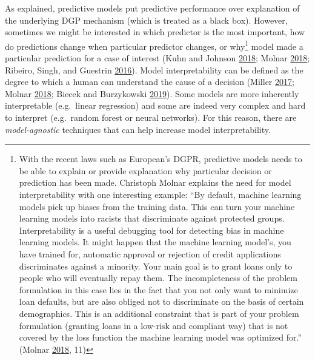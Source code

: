 \documentclass[
]{book}
\begin{document}
As explained, predictive models put predictive performance over explanation of the underlying DGP mechanism (which is treated as a black box). However, sometimes we might be interested in which predictor is the most important, how do predictions change when particular predictor changes, or why\footnote{With the recent laws such as European's DGPR, predictive models needs to be able to explain or provide explanation why particular decision or prediction has been made. Christoph Molnar explains the need for model interpretability with one interesting example: ``By default, machine learning models pick up biases from the training data. This can turn your machine learning models into racists that discriminate against protected groups. Interpretability is a useful debugging tool for detecting bias in machine learning models. It might happen that the machine learning model's, you have trained for, automatic approval or rejection of credit applications discriminates against a minority. Your main goal is to grant loans only to people who will eventually repay them. The incompleteness of the problem formulation in this case lies in the fact that you not only want to minimize loan defaults, but are also obliged not to discriminate on the basis of certain demographics. This is an additional constraint that is part of your problem formulation (granting loans in a low-risk and compliant way) that is not covered by the loss function the machine learning model was optimized for.'' (Molnar \protect\hyperlink{ref-molnarInterpretableMachineLearning2018}{2018}, 11)} model made a particular prediction for a case of interest (Kuhn and Johnson \protect\hyperlink{ref-kuhnAppliedPredictiveModeling2018}{2018}; Molnar \protect\hyperlink{ref-molnarInterpretableMachineLearning2018}{2018}; Ribeiro, Singh, and Guestrin \protect\hyperlink{ref-ribeiroWhyShouldTrust2016}{2016}). Model interpretability can be defined as the degree to which a human can understand the cause of a decision (Miller \protect\hyperlink{ref-millerExplanationArtificialIntelligence2017}{2017}; Molnar \protect\hyperlink{ref-molnarInterpretableMachineLearning2018}{2018}; Biecek and Burzykowski \protect\hyperlink{ref-biecekPredictiveModelsExplore2019}{2019}). Some models are more inherently interpretable (e.g.~linear regression) and some are indeed very complex and hard to interpret (e.g.~random forest or neural networks). For this reason, there are \emph{model-agnostic} techniques that can help increase model interpretability.
\end{document}
